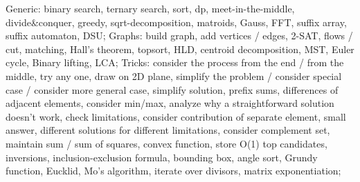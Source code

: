 Generic: binary search, ternary search, sort, dp, meet-in-the-middle, divide&conquer, greedy, sqrt-decomposition, matroids, Gauss, FFT, suffix array, suffix automaton, DSU;
Graphs: build graph, add vertices / edges, 2-SAT, flows / cut, matching, Hall's theorem, topsort, HLD, centroid decomposition, MST, Euler cycle, Binary lifting, LCA;
Tricks: consider the process from the end / from the middle, try any one, draw on 2D plane, simplify the problem / consider special case / consider more general case, simplify solution, prefix sums, differences of adjacent elements, consider min/max, analyze why a straightforward solution doesn't work, check limitations, consider contribution of separate element, small answer, different solutions for different limitations, consider complement set, maintain sum / sum of squares, convex function, store O(1) top candidates, inversions, inclusion-exclusion formula, bounding box, angle sort, Grundy function, Eucklid, Mo's algorithm, iterate over divisors, matrix exponentiation;